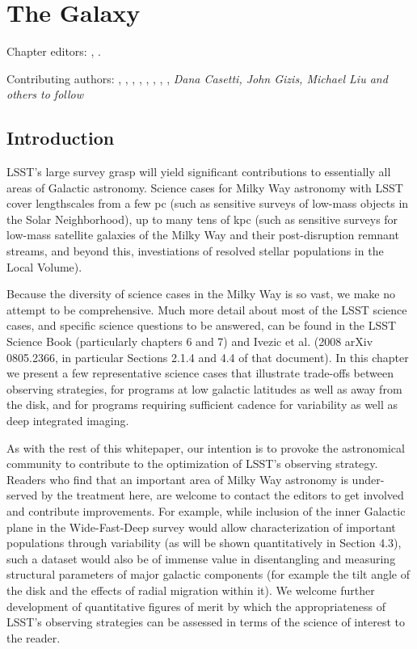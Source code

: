 
\chapter{The Galaxy}
\def\chpname{galaxy}\label{chp:\chpname}

Chapter editors:
,
.

Contributing authors:
,
,
,
,
,
,
,
,
{\it Dana Casetti, John Gizis, Michael Liu and others to follow}



\section{Introduction}
\def\secname{MW_Intro}\label{sec:\secname}

LSST's large survey grasp will yield significant contributions to
essentially all areas of Galactic astronomy. Science cases for Milky
Way astronomy with LSST cover lengthscales from a few pc (such as
sensitive surveys of low-mass objects in the Solar Neighborhood), up
to many tens of kpc (such as sensitive surveys for low-mass satellite
galaxies of the Milky Way and their post-disruption remnant streams,
and beyond this, investiations of resolved stellar populations in the
Local Volume). 

Because the diversity of science cases in the Milky Way is so vast, we
make no attempt to be comprehensive. Much more detail about most of
the LSST science cases, and specific science questions to be answered,
can be found in the LSST Science Book (particularly chapters 6 and 7)
and Ivezic et al. (2008 arXiv 0805.2366, in particular Sections 2.1.4
and 4.4 of that document). In this chapter we present a few
representative science cases that illustrate trade-offs between
observing strategies, for programs at low galactic latitudes as well
as away from the disk, and for programs requiring sufficient cadence
for variability as well as deep integrated imaging. 

As with the rest of this whitepaper, our intention is to provoke the
astronomical community to contribute to the optimization of LSST's
observing strategy. Readers who find that an important area of Milky
Way astronomy is under-served by the treatment here, are welcome to
contact the editors to get involved and contribute improvements. For
example, while inclusion of the inner Galactic plane in the
Wide-Fast-Deep survey would allow characterization of important
populations through variability (as will be shown quantitatively in
Section 4.3), such a dataset would also be of immense value in
disentangling and measuring structural parameters of major galactic
components (for example the tilt angle of the disk and the effects of
radial migration within it). We welcome further development of
quantitative figures of merit by which the appropriateness of LSST's observing
strategies can be assessed in terms of the science of interest to the
reader.

